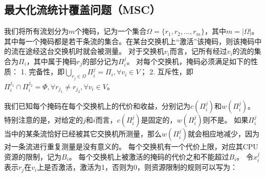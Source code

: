 








\subsection{最大化流统计覆盖问题（MSC）}\label{sec:mscdef}
我们将所有流划分为$m$个掩码，记为一个集合$\Omega=\{r_1,r_2,...,r_m\}$，其中$m = |\Omega|$。
其中每一个掩码都是若干条流的集合。在某台交换机上“激活”该掩码，则该掩码中的流在途经这台交换机时就会被测量。
对于交换机$v_i$而言，记所有经过$v_i$的流的集合为$\Pi_i$，其中属于掩码$r_j$的部分记为$\Pi^j_i$。
对每个交换机，掩码必须满足如下的性质：
1. 完备性，即$\bigcup\nolimits_{r_j \in \Omega} \Pi^j_i = \Pi_i, \forall v_i \in V$；
2. 互斥性，即$\Pi^{j_1}_i \cap \Pi^{j_2}_i = \Phi, \forall r_{j_1} \neq r_{j_2}, \forall v_i \in V$。

我们已知每个掩码在每个交换机上的代价和收益，分别记为$c(\Pi^j_i)$和$w(\Pi^j_i)$。
特别注意的是，对给定的$j$和$i$而言，$c(\Pi^j_i)$是固定的，$w(\Pi^j_i)$则不是。
如果$\Pi^j_i$当中的某条流恰好已经被其它交换机所测量，那么$w(\Pi^j_i)$就会相应地减少，因为对一条流进行重复测量是没有意义的。
每个交换机有一个代价上限，对应其CPU资源的限制，记为$B_i$。
每个交换机上被激活的掩码的代价之和不能超过$B_i$。
令$x_i^j$表示$r_j$在$v_i$上是否激活，激活为1，否则为0，则资源限制的规则可以写为：

